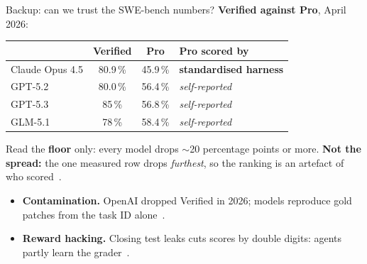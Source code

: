 \documentclass[
  aspectratio=169,
  font=times,
  sectionpage=true,
]{tumbeamer}
\begin{document}
\begin{frame}[noframenumbering]{Backup: can we trust the SWE-bench numbers?}
  \label{fr:trust}
  \textbf{Verified against Pro}, April 2026:

  \medskip
  \begin{center}
    \small
    \begin{tabular}{@{}lccl@{}}
      \toprule
      & \textbf{Verified} & \textbf{Pro} & \textbf{Pro scored by} \\
      \midrule
      Claude Opus 4.5 & 80.9\,\% & 45.9\,\%
        & \textbf{standardised harness} \\
      GPT-5.2 & 80.0\,\% & 56.4\,\% & {\color{TUMGrayDark}\emph{self-reported}} \\
      GPT-5.3 & 85\phantom{.0}\,\% & 56.8\,\% & {\color{TUMGrayDark}\emph{self-reported}} \\
      GLM-5.1 & 78\phantom{.0}\,\% & 58.4\,\% & {\color{TUMGrayDark}\emph{self-reported}} \\
      \bottomrule
    \end{tabular}
  \end{center}

  \medskip
  {\footnotesize Read the \textbf{floor} only: every model drops $\sim$20
  percentage points or more. \textbf{Not the spread:} the one measured row drops
  \emph{furthest}, so the ranking is an artefact of who
  scored~\cite{deng2025swebenchpro,agentmarketcap2026gap}.}

  \medskip
  \begin{itemize}
    \item \textbf{Contamination.} OpenAI dropped Verified in 2026; models
      reproduce gold patches from the task ID alone~\cite{openai2026swebench}.
    \item \textbf{Reward hacking.} Closing test leaks cuts scores by double
      digits: agents partly learn the grader~\cite{cursor2025rewardhacking}.
  \end{itemize}
\end{frame}
\end{document}
